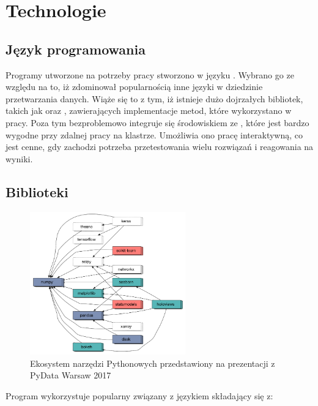 \section{Technologie}\label{sec:technologie}

\subsection{Język programowania}

Programy utworzone na potrzeby pracy stworzono w języku . Wybrano go
ze względu na to, iż zdominował popularnością inne języki w dziedzinie przetwarzania danych.
Wiąże się to z tym, iż istnieje dużo dojrzałych bibliotek, takich jak 
oraz , zawierających implementacje metod, które wykorzystano w pracy.
Poza tym bezproblemowo integruje się środowiskiem ze , które jest bardzo wygodne przy
zdalnej pracy na klastrze. Umożliwia ono pracę interaktywną, co jest cenne, gdy zachodzi
potrzeba przetestowania wielu rozwiązań i reagowania na wyniki.

\subsection{Biblioteki}

\begin{figure}[H]
    \centering
    \includegraphics[width=0.6\textwidth]{images/3_3_ecosystem}
    \caption{Ekosystem narzędzi Pythonowych przedstawiony na prezentacji z PyData Warsaw 2017\cite{thePythonEcosystem}}
    \label{fig:3_3_ecosystem}
\end{figure}

Program wykorzystuje popularny  związany z językiem  składający się z:

